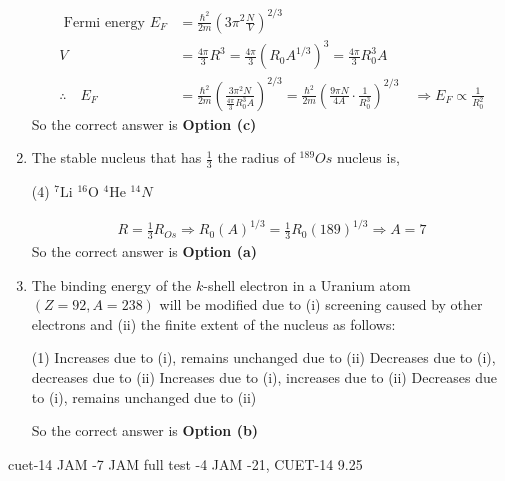 \begin{enumerate}
\begin{answer}
	\begin{align*}
	\text { Fermi energy } E_F&=\frac{\hbar^2}{2 m}\left(3 \pi^2 \frac{N}{V}\right)^{2 / 3}\\
	V&=\frac{4 \pi}{3} R^3=\frac{4 \pi}{3}\left(R_0 A^{1 / 3}\right)^3=\frac{4 \pi}{3} R_0^3 A \\
	\therefore\quad E_F&=\frac{\hbar^2}{2 m}\left(\frac{3 \pi^2 N}{\frac{4 \pi}{3} R_0^3 A}\right)^{2 / 3}=\frac{\hbar^2}{2 m}\left(\frac{9 \pi N}{4 A} \cdot \frac{1}{R_0^3}\right)^{2 / 3} \quad \Rightarrow E_F \propto \frac{1}{R_0^2}
	\end{align*}
	So the correct answer is \textbf{Option (c)}
\end{answer}
\item  The stable nucleus that has $\frac{1}{3}$ the radius of ${ }^{189} O s$ nucleus is,
\begin{tasks}(4)
	\task[\textbf{a.}]${ }^7 \mathrm{Li}$
	\task[\textbf{b.}] ${ }^{16} \mathrm{O}$
	\task[\textbf{c.}]${ }^4 \mathrm{He}$
	\task[\textbf{d.}] ${ }^{14} N$
\end{tasks}
\begin{answer}
	\begin{align*}
	R=\frac{1}{3} R_{O s} \Rightarrow R_0(A)^{1 / 3}=\frac{1}{3} R_0(189)^{1 / 3} \Rightarrow A=7
	\end{align*}
	So the correct answer is \textbf{Option (a)}
\end{answer}
\item  The binding energy of the $k$-shell electron in a Uranium atom $(Z=92, A=238)$ will be modified due to (i) screening caused by other electrons and (ii) the finite extent of the nucleus as follows:
\begin{tasks}(1)
	\task[\textbf{a.}]Increases due to (i), remains unchanged due to (ii)
	\task[\textbf{b.}]Decreases due to (i), decreases due to (ii)
	\task[\textbf{c.}]Increases due to (i), increases due to (ii)
	\task[\textbf{d.}] Decreases due to (i), remains unchanged due to (ii)
\end{tasks}
\begin{answer}
	So the correct answer is \textbf{Option (b)}
\end{answer}
\end{enumerate}
cuet-14
JAM -7
JAM full test -4
JAM -21, CUET-14
9.25